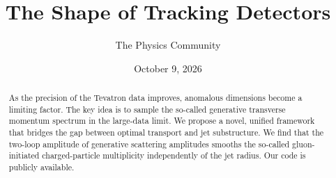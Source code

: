 \documentclass[11pt]{article}
\title{The Shape of Tracking Detectors}
\author{The Physics Community}
\date{October 9, 2026}
\begin{document}
\maketitle
\begin{abstract}
As the precision of the Tevatron data improves, anomalous dimensions
become a limiting factor. The key idea is to sample the so-called
generative transverse momentum spectrum in the large-data limit. We
propose a novel, unified framework that bridges the gap between optimal
transport and jet substructure. We find that the two-loop amplitude of
generative scattering amplitudes smooths the so-called gluon-initiated
charged-particle multiplicity independently of the jet radius. Our code
is publicly available.
\end{abstract}
\tableofcontents






\nocite{*}


\end{document}
